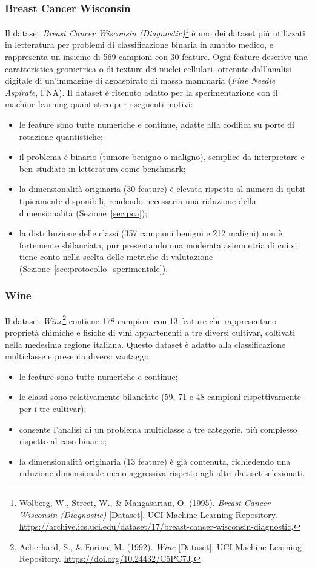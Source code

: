 \subsubsection{Breast Cancer Wisconsin}
Il dataset \textit{Breast Cancer Wisconsin (Diagnostic)}\footnote{Wolberg, W., Street, W., \& Mangasarian, O. (1995). \textit{Breast Cancer Wisconsin (Diagnostic)} [Dataset]. UCI Machine Learning Repository. \url{https://archive.ics.uci.edu/dataset/17/breast-cancer-wisconsin-diagnostic}.} è uno dei dataset più utilizzati in letteratura per problemi di classificazione binaria in ambito medico, e rappresenta un insieme di 569 campioni con 30 feature. Ogni feature descrive una caratteristica geometrica o di texture dei nuclei cellulari, ottenute dall'analisi digitale di un'immagine di agoaspirato di massa mammaria (\textit{Fine Needle Aspirate}, FNA). Il dataset è ritenuto adatto per la sperimentazione con il machine learning quantistico per i seguenti motivi:
\begin{itemize}
    \item le feature sono tutte numeriche e continue, adatte alla codifica su porte di rotazione quantistiche;
    \item il problema è binario (tumore benigno o maligno), semplice da interpretare e ben studiato in letteratura come benchmark;
    \item la dimensionalità originaria (30 feature) è elevata rispetto al numero di qubit tipicamente disponibili, rendendo necessaria una riduzione della dimensionalità (Sezione~\ref{sec:pca});
    \item la distribuzione delle classi (357 campioni benigni e 212 maligni) non è fortemente sbilanciata, pur presentando una moderata asimmetria di cui si tiene conto nella scelta delle metriche di valutazione (Sezione~\ref{sec:protocollo_sperimentale}).
\end{itemize}

\subsubsection{Wine}
Il dataset \textit{Wine}\footnote{Aeberhard, S., \& Forina, M. (1992). \textit{Wine} [Dataset]. UCI Machine Learning Repository. \url{https://doi.org/10.24432/C5PC7J}.} contiene 178 campioni con 13 feature che rappresentano proprietà chimiche e fisiche di vini appartenenti a tre diversi cultivar, coltivati nella medesima regione italiana. Questo dataset è adatto alla classificazione multiclasse e presenta diversi vantaggi:
\begin{itemize}
    \item le feature sono tutte numeriche e continue;
    \item le classi sono relativamente bilanciate (59, 71 e 48 campioni rispettivamente per i tre cultivar);
    \item consente l'analisi di un problema multiclasse a tre categorie, più complesso rispetto al caso binario;
    \item la dimensionalità originaria (13 feature) è già contenuta, richiedendo una riduzione dimensionale meno aggressiva rispetto agli altri dataset selezionati.
\end{itemize}

